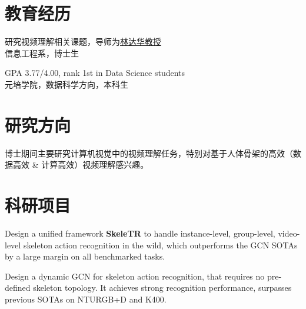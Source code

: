 \documentclass{resume}
\begin{document}
\linespread{1.2}




\vspace{-2mm}

\section{教育经历}

研究视频理解相关课题，导师为\href{https://dahua.me}{林达华教授} \\
信息工程系，博士生

GPA 3.77/4.00, rank 1st in Data Science students \\
元培学院，数据科学方向，本科生

\vspace{-2mm}

\section{研究方向}
博士期间主要研究计算机视觉中的视频理解任务，特别对基于人体骨架的高效（数据高效 \& 计算高效）视频理解感兴趣。

\vspace{-2mm}

\section{科研项目}
Design a unified framework \textbf{SkeleTR} to handle instance-level, group-level, video-level skeleton action recognition in the wild, which outperforms the GCN SOTAs by a large margin on all benchmarked tasks.

\vspace{-2mm}

Design a dynamic GCN for skeleton action recognition,
that requires no pre-defined skeleton topology.
It achieves strong recognition performance, surpasses previous SOTAs on NTURGB+D and K400.
\end{document}
